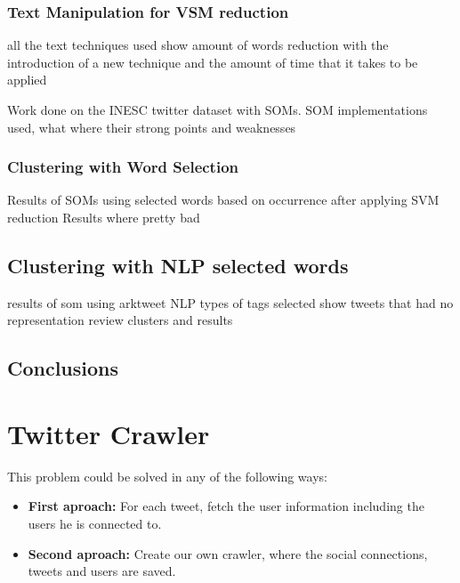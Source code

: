 \subsubsection{Text Manipulation for VSM reduction}
\label{ssub:Text Manipulation for SVM reduction}
{\color{red} all the text techniques used }
{\color{red} show amount of words reduction with the introduction of a new technique and the amount of time that it takes to be applied }

Work done on the INESC twitter dataset with SOMs.
SOM implementations used, what where their strong points and weaknesses

\subsubsection{Clustering with Word Selection }
\label{ssub:Word Selection for Clustering}
{\color{red} Results of SOMs using selected words based on occurrence after applying SVM reduction }
{\color{red} Results where pretty bad }

\subsection{Clustering with NLP selected words}
\label{sub:clustering_with_nlp_selected_words}
{\color{red} results of som using arktweet NLP }
{\color{red} types of tags selected }
{\color{red} show tweets that had no representation }
{\color{red} review clusters and results }

\subsection{Conclusions}
\label{sub:conclusions}



\section{Twitter Crawler}
\label{sec:twitter_crawler}
  This problem could be solved in any of the following ways:
\begin{itemize}
  \item \textbf{First aproach: } For each tweet, fetch the user information including the users he is connected to.
  \item \textbf{Second aproach: } Create our own crawler, where the social connections, tweets and users are saved.
\end{itemize}                                                                                             


